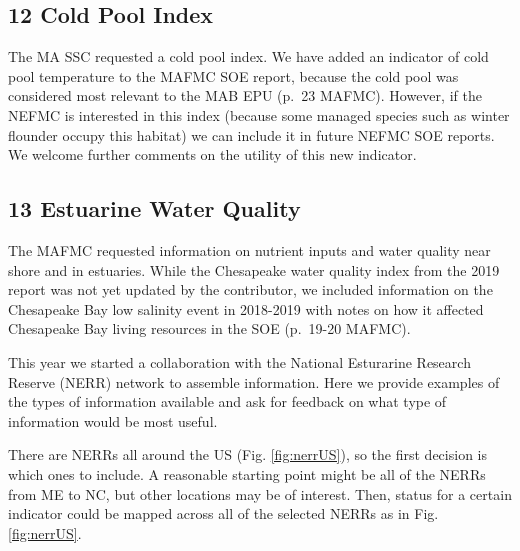 \documentclass[
  10pt,
]{article}
\begin{document}
\hypertarget{cold-pool-index}{%
\subsection{12 Cold Pool Index}\label{cold-pool-index}}

The MA SSC requested a cold pool index. We have added an indicator of
cold pool temperature to the MAFMC SOE report, because the cold pool was
considered most relevant to the MAB EPU (p.~23 MAFMC). However, if the
NEFMC is interested in this index (because some managed species such as
winter flounder occupy this habitat) we can include it in future NEFMC
SOE reports. We welcome further comments on the utility of this new
indicator.

\hypertarget{estuarine-water-quality}{%
\subsection{13 Estuarine Water Quality}\label{estuarine-water-quality}}

The MAFMC requested information on nutrient inputs and water quality
near shore and in estuaries. While the Chesapeake water quality index
from the 2019 report was not yet updated by the contributor, we included
information on the Chesapeake Bay low salinity event in 2018-2019 with
notes on how it affected Chesapeake Bay living resources in the SOE
(p.~19-20 MAFMC).

This year we started a collaboration with the National Esturarine
Research Reserve (NERR) network to assemble information. Here we provide
examples of the types of information available and ask for feedback on
what type of information would be most useful.

There are NERRs all around the US (Fig. \ref{fig:nerrUS}), so the first
decision is which ones to include. A reasonable starting point might be
all of the NERRs from ME to NC, but other locations may be of interest.
Then, status for a certain indicator could be mapped across all of the
selected NERRs as in Fig. \ref{fig:nerrUS}.
\end{document}
